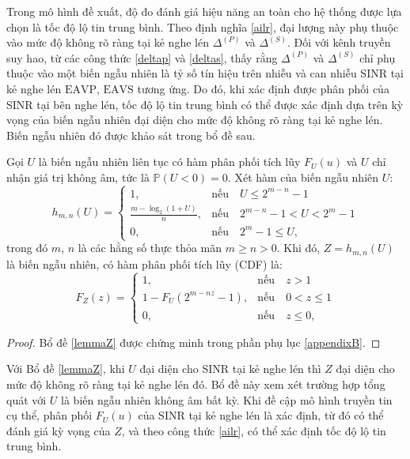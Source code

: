 \documentclass[../main.tex]{subfiles}
\begin{document}
Trong mô hình đề xuất, độ đo đánh giá hiệu năng an toàn cho hệ thống được lựa chọn là tốc độ lộ tin trung bình. Theo định nghĩa \eqref{ailr}, đại lượng này phụ thuộc vào mức độ không rõ ràng tại kẻ nghe lén $\Delta^{(P)}$ và $\Delta^{(S)}$. Đối với kênh truyền suy hao, từ các công thức \eqref{deltap} và \eqref{deltas}, thấy rằng $\Delta^{(P)}$ và $\Delta^{(S)}$ chỉ phụ thuộc vào một biến ngẫu nhiên là tỷ số tín hiệu trên nhiễu và can nhiễu SINR tại kẻ nghe lén $\text{EAVP}$, $\text{EAVS}$ tương ứng. Do đó, khi xác định được phân phối của SINR tại bên nghe lén, tốc độ lộ tin trung bình có thể được xác định dựa trên kỳ vọng của biến ngẫu nhiên đại diện cho mức độ không rõ ràng tại kẻ nghe lén. Biến ngẫu nhiên đó được khảo sát trong bổ đề sau.

\begin{lemma}\label{lemmaZ}
Gọi $U$ là biến ngẫu nhiên liên tục có hàm phân phối tích lũy $F_U(u)$ và $U$ chỉ nhận giá trị không âm, tức là $\mathbb{P}\left(U < 0\right) = 0$. Xét hàm của biến ngẫu nhiên $U$:
\begin{equation}\label{lemmaZ:Z}
h_{m,n}\left(U\right)=
\begin{cases}
1,& \text{nếu}\quad U\leq 2^{m-n}-1\\
\frac{m - \log_2\left({1 + U}\right)}{n},& \text{nếu}\quad 2^{m-n} - 1 < U < 2^m - 1\\
0 ,& \text{nếu}\quad 2^m-1 \leq U,
\end{cases}
\end{equation}
trong đó $m$, $n$ là các hằng số thực thỏa mãn $m \geq n > 0$. Khi đó, $Z = h_{m,n}\left(U\right)$ là biến ngẫu nhiên, có hàm phân phối tích lũy (CDF) là:
\begin{equation}\label{lemmaZ:CDF}
F_Z\left(z\right) = 
\begin{cases}
1,& \text{nếu}\quad z > 1\\
1-F_U\left(2^{m-nz}-1\right),& \text{nếu}\quad 0 < z \leq 1\\
0 ,& \text{nếu}\quad z \leq 0,
\end{cases}
\end{equation}

\end{lemma}
\begin{proof}
Bổ đề \ref{lemmaZ} được chứng minh trong phần phụ lục \ref{appendixB}.
\end{proof}

Với Bổ đề \ref{lemmaZ}, khi $U$ đại diện cho SINR tại kẻ nghe lén thì $Z$ đại diện cho mức độ không rõ ràng tại kẻ nghe lén đó. Bổ đề này xem xét trường hợp tổng quát với $U$ là biến ngẫu nhiên không âm bất kỳ. Khi đề cập mô hình truyền tin cụ thể, phân phối $F_U\left(u\right)$ của SINR tại kẻ nghe lén là xác định, từ đó có thể đánh giá kỳ vọng của $Z$, và theo công thức \eqref{ailr}, có thể xác định tốc độ lộ tin trung bình.
\end{document}

